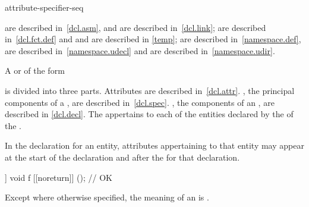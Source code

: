 \begin{bnf}
\br
    \terminal{;}
\end{bnf}

\begin{bnf}
\br
    attribute-specifier-seq \terminal{;}
\end{bnf}

\begin{note}
 are described in~\ref{dcl.asm}, and
 are described in~\ref{dcl.link};
 are described in~\ref{dcl.fct.def} and
 and
 are described in \ref{temp};
 are described in~\ref{namespace.def},
 are described in~\ref{namespace.udecl} and
 are described in~\ref{namespace.udir}.
\end{note}

\pnum
A
 or
 of the form

\begin{ncsimplebnf}
   \terminal{;}
\end{ncsimplebnf}

is divided into three parts.
Attributes are described in~\ref{dcl.attr}.
, the principal components of
a , are described in~\ref{dcl.spec}.
, the components of an
, are described in \ref{dcl.decl}.
The 
appertains to each of the entities declared by
the 
of the .
\begin{note} In the declaration for an entity, attributes appertaining to that
entity may appear at the start of the declaration and after the
 for that declaration.
\end{note} \begin{example}
\begin{codeblock}
[[noreturn]] void f [[noreturn]] ();    // OK
\end{codeblock}
\end{example}

\pnum
Except where otherwise specified, the meaning of an 
is .

